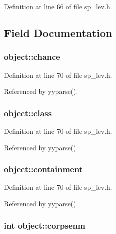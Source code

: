 Definition at line 66 of file sp\+\_\+lev.\+h.



\subsection{Field Documentation}
\hypertarget{structobject_ad3bcfb453ef8a5f6d3d98f1e6a7272f1}{
\subsubsection[{chance}]{ object\+::chance}}\label{structobject_ad3bcfb453ef8a5f6d3d98f1e6a7272f1}


Definition at line 70 of file sp\+\_\+lev.\+h.



Referenced by yyparse().

\hypertarget{structobject_a5450b696036bcd71d636be3e98508a72}{
\subsubsection[{class}]{ object\+::class}}\label{structobject_a5450b696036bcd71d636be3e98508a72}


Definition at line 70 of file sp\+\_\+lev.\+h.



Referenced by yyparse().

\hypertarget{structobject_a787b3970195160628997c28e50e448f2}{
\subsubsection[{containment}]{ object\+::containment}}\label{structobject_a787b3970195160628997c28e50e448f2}


Definition at line 70 of file sp\+\_\+lev.\+h.



Referenced by yyparse().

\hypertarget{structobject_af0d57d60659d214f46dee12f33858b4e}{
\subsubsection[{corpsenm}]{\setlength{\rightskip}{0pt plus 5cm}int object\+::corpsenm}}\label{structobject_af0d57d60659d214f46dee12f33858b4e}


